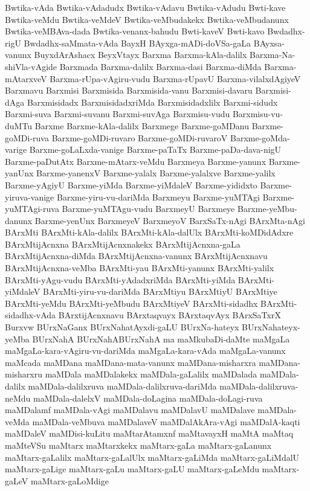 {Bwtika-vAda
Bwtika-vAdadudx
Bwtika-vAdavu
Bwtika-vAdudu
Bwti-kave
Bwtika-veMdu
Bwtika-veMdeV
Bwtika-veMbudakekx
Bwtika-veMbudanunx
Bwtika-veMBAva-dada
Bwtika-venanx-bahudu
Bwti-kaveV
Bwti-kavo
Bwdadhx-rigU
Bwdadhx-saMmata-vAda
BayxH
BAyxga-mADi-doVSa-gaLa
BAyxsa-vanunx
BuyxdArAshacx
BeyxVtayx
Barxma
Barxma-kAla-dalilx
Barxma-Na-shiVla-vAgide
Barxmada
Barxma-dalilx
Barxma-dasi
Barxma-diMda
Barxma-mAtarxveV
Barxma-rUpa-vAgiru-vudu
Barxma-rUpavU
Barxma-vilalxdAgiyeV
Barxmavu
Barxmisi
Barxmisida
Barxmisida-vanu
Barxmisi-davaru
Barxmisi-dAga
Barxmisidadx
BarxmisidadxriMda
Barxmisidadxlilx
Barxmi-sidudx
Barxmi-suva
Barxmi-suvanu
Barxmi-suvAga
Barxmisu-vudu
Barxmisu-vu-duMTu
Barxme
Barxme-kAla-dalilx
Barxmege
Barxme-goMDanu
Barxme-goMDi-ruva
Barxme-goMDi-ruvaro
Barxme-goMDi-ruvaroV
Barxme-goMda-varige
Barxme-goLaLxda-vanige
Barxme-paTaTx
Barxme-paDa-dava-nigU
Barxme-paDutAtx
Barxme-mAtarx-veMdu
Barxmeya
Barxme-yanunx
Barxme-yanUnx
Barxme-yanenxV
Barxme-yalalx
Barxme-yalalxve
Barxme-yalilx
Barxme-yAgiyU
Barxme-yiMda
Barxme-yiMdaleV
Barxme-yididxto
Barxme-yiruva-vanige
Barxme-yiru-vu-dariMda
Barxmeyu
Barxme-yuMTAgi
Barxme-yuMTAgi-ruva
Barxme-yuMTAgu-vudu
BarxmeyU
Barxmeye
Barxme-yeMbu-danunx
Barxme-yenUnx
BarxmeyeV
BarxmeyoV
BarxSaTx-nAgi
BArxMta-nAgi
BArxMti
BArxMti-kAla-dalilx
BArxMti-kAla-dalUlx
BArxMti-koMDidAdxre
BArxMtijAcnxna
BArxMtijAcnxnakekx
BArxMtijAcnxna-gaLa
BArxMtijAcnxna-diMda
BArxMtijAcnxna-vanunx
BArxMtijAcnxnavu
BArxMtijAcnxna-veMba
BArxMti-yau
BArxMti-yanunx
BArxMti-yalilx
BArxMti-yAgu-vudu
BArxMti-yAdadxriMda
BArxMti-yiMda
BArxMti-yiMdaleV
BArxMti-yiru-vu-dariMda
BArxMtiyu
BArxMtiyU
BArxMtiye
BArxMti-yeMdu
BArxMti-yeMbudu
BArxMtiyeV
BArxMti-sidadhx
BArxMti-sidadhx-vAda
BArxtijAcnxnavu
BArxtaqvayx
BArxtaqvAyx
BArxSaTxrX
Burxvw
BUrxNaGanx
BUrxNahatAyxdi-gaLU
BUrxNa-hateyx
BUrxNahateyx-yeMba
BUrxNahA
BUrxNahABUrxNahA
ma
maMkubaDi-daMte
maMgaLa
maMgaLa-kara-vAgiru-vu-dariMda
maMgaLa-kara-vAda
maMgaLa-vanunx
maMcada
maMDana
maMDana-mata-vanunx
maMDana-misharxra
maMDana-misharxru
maMDala
maMDalakekx
maMDala-gaLalilx
maMDalada
maMDala-dalilx
maMDala-dalilxruva
maMDala-dalilxruva-dariMda
maMDala-dalilxruva-neMdu
maMDala-dalelxV
maMDala-doLagina
maMDala-doLagi-ruva
maMDalamf
maMDala-vAgi
maMDalavu
maMDalavU
maMDalave
maMDala-veMda
maMDala-veMbuva
maMDalaveV
maMDalAkAra-vAgi
maMDalA-kaqti
maMDaleV
maMDisi-kuLitu
maMtarAtamxnf
maMtavayxH
maMtA
maMtaq
maMteVSu
maMtarx
maMtarxkekx
maMtarx-gaLa
maMtarx-gaLanunx
maMtarx-gaLalilx
maMtarx-gaLalUlx
maMtarx-gaLiMda
maMtarx-gaLiMdalU
maMtarx-gaLige
maMtarx-gaLu
maMtarx-gaLU
maMtarx-gaLeMdu
maMtarx-gaLeV
maMtarx-gaLoMdige
}
